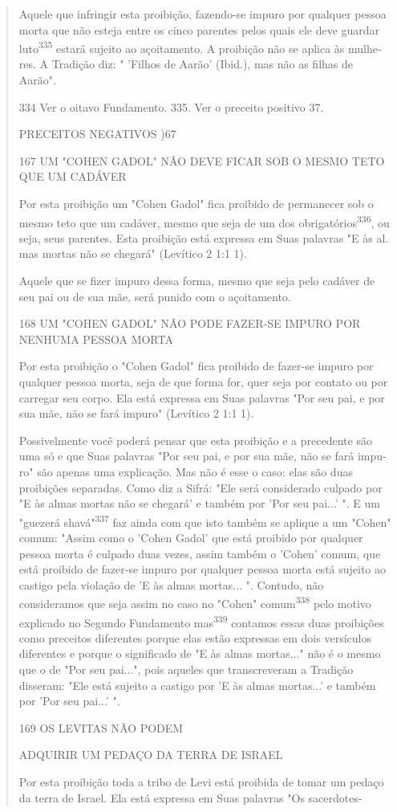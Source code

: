 \begin{quote}
Aquele que infringir esta proibição, fazendo-se impuro por qualquer
pessoa morta que não esteja entre os cinco parentes pelos quais ele deve
guar­dar luto\textsuperscript{335} estará sujeito ao açoitamento. A
proibição não se aplica às mulhe­res. A Tradição diz: " 'Filhos de
Aarão' (Ibid.), mas não as filhas de Aarão".

334 Ver o oitavo Fundamento. 335. Ver o preceito positivo 37.

PRECEITOS NEGATIVOS )67

167 UM "COHEN GADOL" NÃO DEVE FICAR SOB O MESMO TETO QUE UM CADÁVER

Por esta proibição um "Cohen Gadol" fica proibido de permanecer sob o
mesmo teto que um cadáver, mesmo que seja de um dos
obrigatórios\textsuperscript{336}, ou seja, seus parentes. Esta
proibição está expressa em Suas palavras "E às al­. mas mortas não se
chegará" (Levítico 2 1:1 1).

Aquele que se fizer impuro dessa forma, mesmo que seja pelo cadá­ver de
seu pai ou de sua mãe, será punido com o açoitamento.

168 UM "COHEN GADOL" NÃO PODE FAZER-SE IMPURO POR NENHUMA PESSOA MORTA

Por esta proibição o "Cohen Gadol" fica proibido de fazer-se impu­ro por
qualquer pessoa morta, seja de que forma for, quer seja por contato ou
por carregar seu corpo. Ela está expressa em Suas palavras "Por seu pai,
e por sua mãe, não se fará impuro" (Levítico 2 1:1 1).

Possivelmente você poderá pensar que esta proibição e a preceden­te são
uma só e que Suas palavras "Por seu pai, e por sua mãe, não se fará
impu­ro" são apenas uma explicação. Mas não é esse o caso: elas são duas
proibições separadas. Como diz a Sifrá: "Ele será considerado culpado
por "E às almas mor­tas não se chegará' e também por 'Por seu pai...' ".
E um "guezerá shavá"\textsuperscript{337} faz ainda com que isto também
se aplique a um "Cohen" comum: "Assim co­mo o 'Cohen Gadol' que está
proibido por qualquer pessoa morta é culpado duas vezes, assim também o
'Cohen' comum, que está proibido de fazer-se im­puro por qualquer pessoa
morta está sujeito ao castigo pela violação de 'E às almas mortas... ".
Contudo, não consideramos que seja assim no caso no "Co­hen"
comum\textsuperscript{338} pelo motivo explicado no Segundo Fundamento
mas\textsuperscript{339} con­tamos essas duas proibições como preceitos
diferentes porque elas estão ex­pressas em dois versículos diferentes e
porque o significado de "E às almas mor­tas..." não é o mesmo que o de
"Por seu pai...", pois aqueles que transcreve­ram a Tradição disseram:
"Ele está sujeito a castigo por 'E às almas mortas...' e também por 'Por
seu pai...' ".

169 OS LEVITAS NÃO PODEM

ADQUIRIR UM PEDAÇO DA TERRA DE ISRAEL

Por esta proibição toda a tribo de Levi está proibida de tomar um pedaço
da terra de Israel. Ela está expressa em Suas palavras "Os sacerdotes-
\end{quote}

